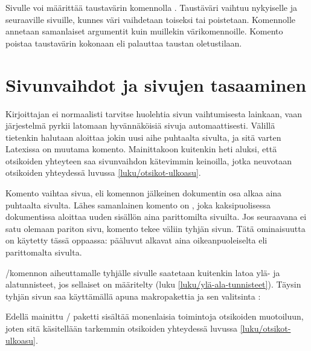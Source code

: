 Sivulle voi määrittää taustavärin komennolla .
Taustäväri vaihtuu nykyiselle ja seuraaville sivuille, kunnes väri
vaihdetaan toiseksi tai poistetaan. Komennolle annetaan samanlaiset
argumentit kuin muillekin värikomennoille. Komento
 poistaa taustavärin kokonaan eli palauttaa
taustan oletustilaan.

\begin{koodilohkosis}
\pagecolor{nimi} %
\pagecolor[värimalli]{parametrit}
\nopagecolor
\end{koodilohkosis}

\section{Sivunvaihdot ja sivujen tasaaminen}
\label{luku/sivunvaihdot}

Kirjoittajan ei normaalisti tarvitse huolehtia sivun vaihtumisesta
lainkaan, vaan järjestelmä pyrkii latomaan hyvännäköisiä sivuja
automaattisesti. Välillä tietenkin halutaan aloittaa jokin uusi aihe
puhtaalta sivulta, ja sitä varten Latexissa on muutama komento.
Mainittakoon kuitenkin heti aluksi, että otsikoiden yhteyteen saa
sivunvaihdon kätevimmin keinoilla, jotka neuvotaan otsikoiden yhteydessä
luvussa \ref{luku/otsikot-ulkoasu}.

Komento  vaihtaa sivua, eli komennon jälkeinen
dokumentin osa alkaa aina puhtaalta sivulta. Lähes samanlainen komento
on , joka kaksipuolisessa dokumentissa
aloittaa uuden sisällön aina parittomilta sivuilta. Jos seuraavana ei
satu olemaan pariton sivu, komento tekee väliin tyhjän sivun. Tätä
ominaisuutta on käytetty tässä oppaassa: pääluvut alkavat aina
oikeanpuoleiselta eli parittomalta sivulta.

\-/komennon aiheuttamalle tyhjälle sivulle
saatetaan kuitenkin latoa ylä- ja alatunnisteet, jos sellaiset on
määritelty (luku \ref{luku/ylä-ala-tunnisteet}). Täysin tyhjän sivun saa
käyttämällä apuna makropakettia  ja
sen valitsinta :

\begin{koodilohkosis}
\usepackage[clearempty]{titlesec}
\end{koodilohkosis}

Edellä mainittu \-/ paketti sisältää monenlaisia
toimintoja otsikoiden muotoiluun, joten sitä käsitellään tarkemmin
otsikoiden yhteydessä luvussa \ref{luku/otsikot-ulkoasu}.

